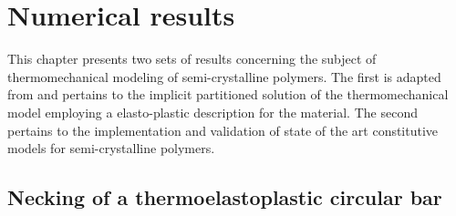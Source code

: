 \chapter{Numerical results} \label{ch:numerical_results}

This chapter presents two sets of results concerning the subject of thermomechanical modeling of semi-crystalline polymers.
The first is adapted from \cite{vila-chaNumericalAssessmentPartitioned2023a} and pertains to the implicit partitioned solution of the thermomechanical model employing a elasto-plastic description for the material.
The second pertains to the implementation and validation of state of the art constitutive models for semi-crystalline polymers.

\section{Necking of a thermoelastoplastic circular bar}
     \label{sec:mech-driv-probl}

